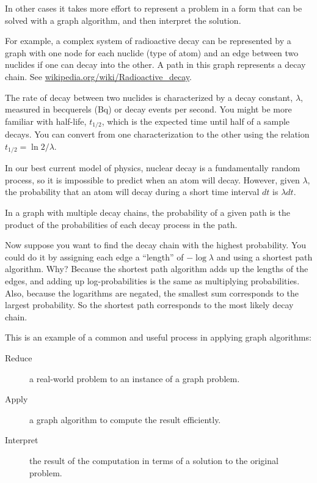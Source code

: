 \documentclass[10pt]{book}
\begin{document}
In other cases it takes more effort to represent a problem in a form
that can be solved with a graph algorithm, and then interpret the
solution.

For example, a complex system of radioactive decay
can be represented by a
graph with one node for each nuclide (type of atom) and an edge
between two nuclides if one can decay into the other.  A path in this
graph represents a decay chain.
See \url{wikipedia.org/wiki/Radioactive_decay}.

The rate of decay between two nuclides is characterized by a decay
constant, $\lambda$, measured in becquerels (Bq) or decay events per
second.  You might be more familiar with half-life, $t_{1/2}$, which
is the expected time until half of a sample decays.  You can convert
from one characterization to the other using the relation $t_{1/2} =
\ln 2 / \lambda$.

In our best current model of physics, nuclear decay is a fundamentally
random process, so it is impossible to predict when an atom will
decay.  However, given $\lambda$, the probability that an atom will
decay during a short time interval $dt$ is $\lambda dt$.

In a graph with multiple decay chains, the probability of a
given path is the product of the probabilities of each decay
process in the path.

Now suppose you want to find the decay chain with the highest
probability.  You could do it by assigning each edge a ``length'' of
$-\log \lambda$ and using a shortest path algorithm.  Why?  Because the
shortest path algorithm adds up the lengths of the edges, and adding
up log-probabilities is the same as multiplying probabilities.  Also,
because the logarithms are negated, the smallest sum corresponds to
the largest probability.  So the shortest path corresponds to the most
likely decay chain.

This is an example of a common and useful process in applying
graph algorithms:

\begin{description}

\item[Reduce] a real-world problem to an instance of a graph
problem.

\item[Apply] a graph algorithm to compute the result efficiently.

\item[Interpret] the result of the computation in terms of a
solution to the original problem.

\end{description}
\end{document}
